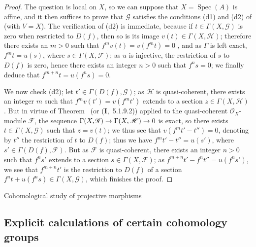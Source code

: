 \documentclass[oneside]{amsart}
\makeatletter
\theoremstyle{ega-env-style}
\theoremstyle{ega-thm-env-style}
\theoremstyle{ega-defn-env-style}
\def\section{\@startsection{section}{1}%
  \z@{.7\linespacing\@plus\linespacing}{.5\linespacing}%
  {\normalfont\bfseries\Large\scshape\centering}}
\def\mathcal{\mathscr}
\def\sh{\mathcal}                   %
\def\Spec{\operatorname{Spec}}
\renewcommand{\to}{\mathchoice{\longrightarrow}{\rightarrow}{\rightarrow}{\rightarrow}}
\newcommand{\oldpage}[2][]{{\marginnote{\normalfont{\textbf{#1}~|~#2}}}\ignorespaces}
\let\EGAOriginalLabel\label
\renewcommand{\label}[1]{\phantomsection\EGAOriginalLabel{#1}}
\makeatother
\begin{document}
\oldpage[III]{95}
\begin{proof}
The question is local on $X$, so we can suppose that $X=\Spec(A)$ is affine, and it then suffices to prove that $\sh{G}$ satisfies the conditions (d1) and (d2) of  (with $V=X$).
The verification of (d2) is immediate, because if $t\in\Gamma(X,\sh{G})$ is zero when restricted to $D(f)$, then so is its image $v(t)\in\Gamma(X,\sh{H})$; therefore there exists an $m>0$ such that $f^m v(t)=v(f^m t)=0$ , and as $\Gamma$ is left exact, $f^m t=u(s)$, where $s\in\Gamma(X,\sh{F})$; as $u$ is injective, the restriction of $s$ to $D(f)$ is zero, hence  there exists an integer $n>0$ such that $f^n s=0$; we finally deduce that $f^{m+n}t=u(f^n s)=0$.

We now check (d2); let $t'\in\Gamma(D(f),\sh{G})$; as $\sh{H}$ is quasi-coherent, there exists an integer $m$ such that $f^m v(t')=v(f^m t')$ extends to a section $z\in\Gamma(X,\sh{H})$ .
But in virtue of Theorem~ (or (\textbf{I},~5.1.9.2)) applied to the quasi-coherent $\sh{O}_X$-module $\sh{F}$, the sequence $\Gamma(X,\sh{G})\to\Gamma(X,\sh{H})\to 0$ is exact, so there exists $t\in\Gamma(X,\sh{G})$ such that $z=v(t)$; we thus see that $v(f^m t'-t'')=0$, denoting by $t''$ the restriction of $t$ to $D(f)$; thus we have $f^m t'-t''=u(s')$, where $s'\in\Gamma(D(f),\sh{F})$.
But as $\sh{F}$ is quasi-coherent, there exists an integer $n>0$ such that $f^n s'$ extends to a section $s\in\Gamma(X,\sh{F})$; as $f^{m+n}t'-f^n t''=u(f^n s')$, we see that $f^{m+n}t'$ is the restriction to $D(f)$ of a section $f^n t+u(f^n s)\in\Gamma(X,\sh{G})$, which finishes the proof.
\end{proof}
\section{Cohomological study of projective morphisms}
\label{section:III.2}


\subsection{Explicit calculations of certain cohomology groups}
\label{subsection:III.2.1}
\end{document}
